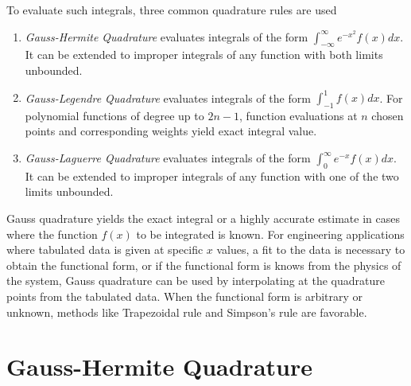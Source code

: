 \documentclass[book.tex]{subfiles}
\begin{document}
To evaluate such integrals, three common quadrature rules are used
\begin{enumerate}
	\item \textit{Gauss-Hermite Quadrature} evaluates integrals of the form $\int_{-\infty}^{\infty}e^{-x^2}f(x)dx$. It can be extended to improper integrals of any function with both limits unbounded.
	\item \textit{Gauss-Legendre Quadrature} evaluates integrals of the form $\int_{-1}^{1}f(x)dx$. For polynomial functions of degree up to $2n-1$, function evaluations at $n$ chosen points and corresponding weights yield exact integral value.
	\item \textit{Gauss-Laguerre Quadrature} evaluates integrals of the form $\int_{0}^{\infty}e^{-x}f(x)dx$.  It can be extended to improper integrals of any function with one of the two limits unbounded.
\end{enumerate}
Gauss quadrature yields the exact integral or a highly accurate estimate in cases where the function $f(x)$ to be integrated is known. For engineering applications where tabulated data is given at specific $x$ values, a fit to the data is necessary to obtain the functional form, or if the functional form is knows from the physics of the system, Gauss quadrature can be used by interpolating at the quadrature points from the tabulated data. When the functional form is arbitrary or unknown, methods like Trapezoidal rule and Simpson's rule are favorable.
\section{Gauss-Hermite Quadrature}

\end{document}
